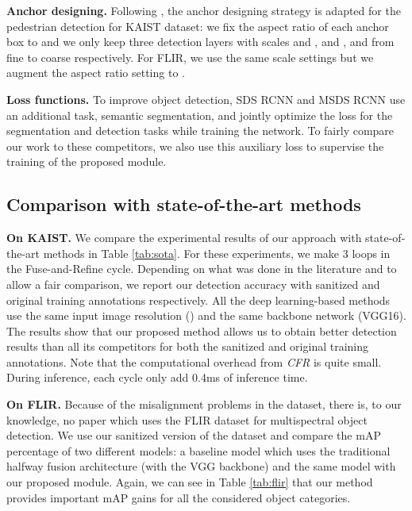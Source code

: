 \documentclass{article}
\begin{document}
\noindent
\textbf{Anchor designing.} Following \cite{fourone}, the anchor designing strategy is adapted for the pedestrian detection for KAIST dataset: we fix the aspect ratio of each anchor box to  and we only keep three detection layers with scales  and ,  and ,  and  from fine to coarse respectively. For FLIR, we use the same scale settings but we augment the aspect ratio setting to .

\noindent
\textbf{Loss functions.} To improve object detection, SDS RCNN \cite{SDS} and MSDS RCNN \cite{MSDS} use an additional task, semantic segmentation, and jointly optimize the loss for the segmentation and detection tasks while training the network. To fairly compare our work to these competitors, we also use this auxiliary loss to supervise the training of the proposed module.

\subsection{Comparison with state-of-the-art methods}

\textbf{On KAIST.} We compare the experimental results of our approach with state-of-the-art methods in Table \ref{tab:sota}.
For these experiments, we make 3 loops in the Fuse-and-Refine cycle. Depending on what was done in the literature and to allow a fair comparison, we report our detection accuracy with sanitized and original training annotations respectively. 
All the deep learning-based methods \cite{TestAnno,RPNM,Illumination-aware-li,Illumination-aware-guan,MSDS} use the same input image resolution () and the same backbone network (VGG16). The results show that our proposed method allows us to obtain better detection results than all its competitors for both the sanitized and original training annotations.
Note that the computational overhead from \textit{CFR} is quite small. During inference, each cycle only add 0.4ms of inference time. 

\noindent
\textbf{On FLIR.} Because of the misalignment problems in the dataset, there is, to our knowledge, no paper which uses the FLIR dataset \cite{Flir} for multispectral object detection. We use our sanitized version of the dataset and compare the mAP percentage of two different models: a baseline model which uses the traditional halfway fusion architecture (with the VGG backbone) and the same model with our proposed module. Again, we can see in Table \ref{tab:flir} that our method provides important mAP gains for all the considered object categories.
\end{document}
